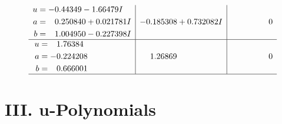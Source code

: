 \documentclass[1p]{elsarticle_modified}
\theoremstyle{definition}
\begin{document}
$$\begin{array}{c|c|c}
\begin{aligned}
u &= -0.44349 - 1.66479 I \\
a &= \phantom{-}0.250840 + 0.021781 I \\
b &= \phantom{-}1.004950 - 0.227398 I\end{aligned}
 & -0.185308 + 0.732082 I & \phantom{-0.000000 } 0 \\ \hline\begin{aligned}
u &= \phantom{-}1.76384\phantom{ +0.000000I} \\
a &= -0.224208\phantom{ +0.000000I} \\
b &= \phantom{-}0.666001\phantom{ +0.000000I}\end{aligned}
 & \phantom{-}1.26869\phantom{ +0.000000I} & \phantom{-0.000000 } 0\\
 \hline 
 \end{array}$$\newpage
\newpage\renewcommand{\arraystretch}{1}
\centering \section*{ III. u-Polynomials}
\end{document}
